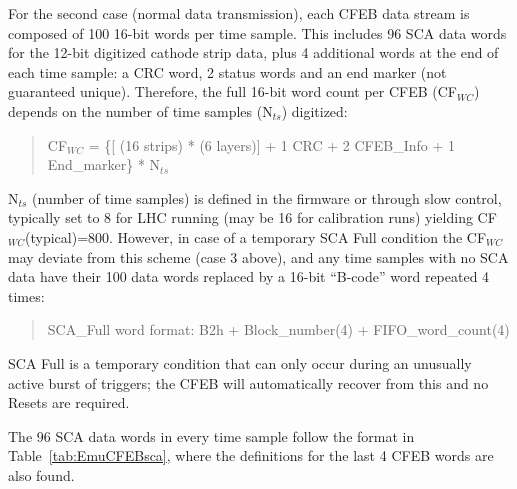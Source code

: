 For the second case (normal data transmission), each CFEB data stream
is composed of 100 16-bit words per time sample.  This includes 96 SCA data
words for the 12-bit digitized cathode strip data, plus 4 additional
words at the end of each time sample: a CRC word, 2 status words and
an end marker (not guaranteed unique).
Therefore, the full 16-bit word count per CFEB (CF$_{WC}$) depends on the
number of time samples (N$_{ts}$) digitized:

\begin{quote}
CF$_{WC}$ = \{[ (16 strips) * (6 layers)] 
       + 1 CRC + 2 CFEB\_Info + 1 End\_marker\} * N$_{ts}$
\end{quote}

N$_{ts}$ (number of time samples) is defined in the firmware
or through slow control,
typically set to 8 for LHC running (may be 16 for calibration runs)
yielding CF$_{WC}$(typical)=800.  However, in case of a temporary
SCA Full condition
the CF$_{WC}$ may deviate from this scheme (case 3 above),
and any %
time samples with no SCA data have their 100 data words replaced
by a 16-bit ``B-code'' word repeated 4 times:
\begin{quote}
SCA\_Full word format:  B2h + Block\_number(4) + FIFO\_word\_count(4)
\end{quote}
SCA Full is a temporary condition that can only occur during an unusually
active burst of triggers; the CFEB will automatically recover from
this and no Resets are required.

The 96 SCA data words in every time sample follow the format
in Table~\ref{tab:EmuCFEBsca}, where the definitions for the
last 4 CFEB words are also found.

